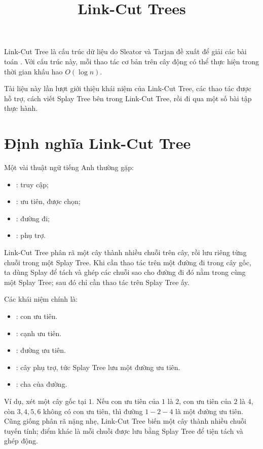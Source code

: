 \documentclass[11pt]{article}
\title{Link-Cut Trees}
\author{}
\date{}
\begin{document}
\maketitle


Link-Cut Tree là cấu trúc dữ liệu do Sleator và Tarjan đề xuất để giải các bài
toán .  Với cấu trúc này, mỗi thao tác cơ bản trên cây động có
thể thực hiện trong thời gian khấu hao $O(\log n)$.

Tài liệu này lần lượt giới thiệu khái niệm của Link-Cut Tree, các thao tác được
hỗ trợ, cách viết Splay Tree bên trong Link-Cut Tree, rồi đi qua một số bài
tập thực hành.

\section{Định nghĩa Link-Cut Tree}

Một vài thuật ngữ tiếng Anh thường gặp:
\begin{itemize}
  \item {}: truy cập;
  \item {}: ưu tiên, được chọn;
  \item {}: đường đi;
  \item {}: phụ trợ.
\end{itemize}

Link-Cut Tree phân rã một cây thành nhiều chuỗi trên cây, rồi lưu riêng từng
chuỗi trong một Splay Tree.  Khi cần thao tác trên một đường đi trong cây gốc,
ta dùng Splay để tách và ghép các chuỗi sao cho đường đi đó nằm trong cùng một
Splay Tree; sau đó chỉ cần thao tác trên Splay Tree ấy.

Các khái niệm chính là:
\begin{itemize}
  \item {}: con ưu tiên.
  \item {}: cạnh ưu tiên.
  \item {}: đường ưu tiên.
  \item {}: cây phụ trợ, tức Splay Tree lưu một đường ưu
  tiên.
  \item {}: cha của đường.
\end{itemize}

Ví dụ, xét một cây gốc tại $1$.  Nếu con ưu tiên của $1$ là $2$, con ưu tiên
của $2$ là $4$, còn $3,4,5,6$ không có con ưu tiên, thì đường $1-2-4$ là một
đường ưu tiên.  Cũng giống phân rã nặng nhẹ, Link-Cut Tree biến một cây thành
nhiều chuỗi tuyến tính; điểm khác là mỗi chuỗi được lưu bằng Splay Tree để tiện
tách và ghép động.
\end{document}
